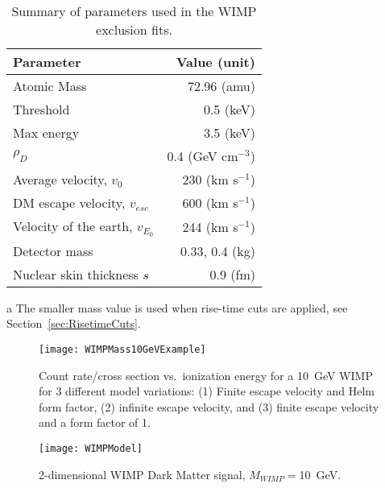 		\begin{table}
			\centering
			\caption[Summary of parameters used in the WIMP exclusion fits]
			{Summary of parameters used in the WIMP exclusion fits.}
			\label{tab:BeGeFitParameters}
			\smallskip
			\begin{threeparttable}
				\begin{tabular}{l r}
					\toprule
					Parameter & Value (unit) \\
					\midrule
					Atomic Mass & 72.96 (amu) \\
					Threshold & 0.5 (keV) \\
					Max energy & 3.5 (keV) \\
					$\rho_{D}$  &  0.4 (GeV cm$^{-3}$) \\
					Average velocity, $v_{0}$ & 230 (km s$^{-1}$) \\
					DM escape velocity, $v_{esc}$ & 600 (km s$^{-1}$) \\
					Velocity of the earth, $v_{E_{0}}$ & 244 (km s$^{-1}$) \\
					Detector mass &  0.33, 0.4\tnote{a} (kg) \\
					Nuclear skin thickness $s$ & 0.9 (fm) \\
					\bottomrule
				\end{tabular}	
				 \begin{tablenotes}
				       \item[a] {The smaller mass value is used when rise-time cuts are applied, see 
				       Section~\ref{sec:RisetimeCuts}.}
			     	\end{tablenotes}
			\end{threeparttable}
		\end{table}
		\begin{figure}
			\centering
			\texttt{[image: WIMPMass10GeVExample]}
			\caption[Count rate/cross section vs.~ionization energy for a 10~GeV WIMP]
			{Count rate/cross section vs.~ionization energy for a 10~GeV WIMP for 3 different model 
			variations: (1) Finite escape velocity and Helm form factor, (2) infinite escape velocity, 
			and (3) finite escape velocity and a form factor of 1.}
			\label{fig:1DDMSignal}
		\end{figure}
		
		\begin{figure}
			\centering
			\texttt{[image: WIMPModel]}
			\caption[2-dimensional WIMP Dark Matter signal]
			{2-dimensional WIMP Dark Matter signal, $M_{WIMP} = $10~GeV.}
			\label{fig:2DDMSignal}
		\end{figure}


